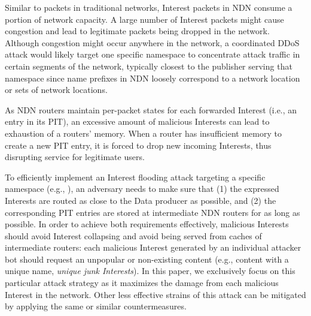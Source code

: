 Similar to packets in traditional networks, Interest packets in NDN consume a portion of network capacity. A large number of Interest packets might cause congestion and lead to legitimate packets being dropped in the network. Although congestion might occur anywhere in the network, a coordinated DDoS attack would likely target one specific namespace to concentrate attack traffic in certain segments of the network, typically closest to the publisher serving that namespace since name prefixes in NDN loosely correspond to a network location or sets of network locations. 

As NDN routers maintain per-packet states for each forwarded Interest (i.e., an entry in its PIT), an excessive amount of malicious Interests can lead to exhaustion of a routers' memory. When a router has insufficient memory to create a new PIT entry, it is forced to drop new incoming Interests, thus disrupting service for legitimate users.





To efficiently implement an Interest flooding attack targeting a specific namespace (e.g., ), an adversary needs to make sure that (1) the expressed Interests are routed as close to the Data producer as possible, and (2) the corresponding PIT entries are stored at intermediate NDN routers for as long as possible.
In order to achieve both requirements effectively, malicious Interests should avoid Interest collapsing and avoid being served from caches of intermediate routers: each malicious Interest generated by an individual attacker bot should request an unpopular or non-existing content (e.g., content with a unique name, \emph{unique junk Interests}). In this paper, we exclusively focus on this particular attack strategy as it maximizes the damage from each malicious Interest in the network. Other less effective strains of this attack can be mitigated by applying the same or similar countermeasures.  

